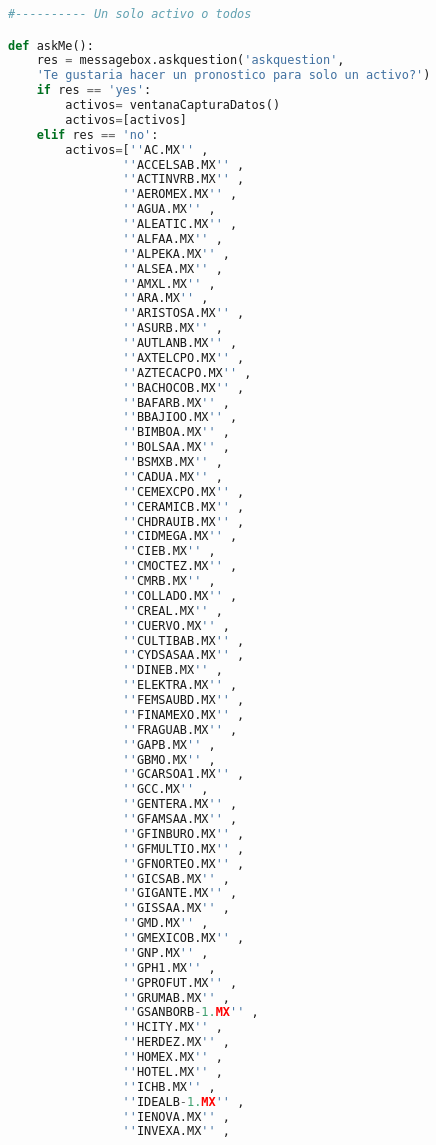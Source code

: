 \documentclass[letterpaper,12pt,oneside]{book}
\begin{document}
\begin{lstlisting}[language=Python]
#---------- Un solo activo o todos

def askMe():
    res = messagebox.askquestion('askquestion', 
    'Te gustaria hacer un pronostico para solo un activo?')
    if res == 'yes':
        activos= ventanaCapturaDatos()
        activos=[activos]
    elif res == 'no':
        activos=[''AC.MX'' , 
                ''ACCELSAB.MX'' ,
                ''ACTINVRB.MX'' , 
                ''AEROMEX.MX'' , 
                ''AGUA.MX'' , 
                ''ALEATIC.MX'' , 
                ''ALFAA.MX'' , 
                ''ALPEKA.MX'' , 
                ''ALSEA.MX'' , 
                ''AMXL.MX'' ,
                ''ARA.MX'' , 
                ''ARISTOSA.MX'' , 
                ''ASURB.MX'' , 
                ''AUTLANB.MX'' , 
                ''AXTELCPO.MX'' , 
                ''AZTECACPO.MX'' ,
                ''BACHOCOB.MX'' , 
                ''BAFARB.MX'' , 
                ''BBAJIOO.MX'' , 
                ''BIMBOA.MX'' , 
                ''BOLSAA.MX'' , 
                ''BSMXB.MX'' , 
                ''CADUA.MX'' , 
                ''CEMEXCPO.MX'' , 
                ''CERAMICB.MX'' , 
                ''CHDRAUIB.MX'' , 
                ''CIDMEGA.MX'' , 
                ''CIEB.MX'' , 
                ''CMOCTEZ.MX'' , 
                ''CMRB.MX'' , 
                ''COLLADO.MX'' , 
                ''CREAL.MX'' , 
                ''CUERVO.MX'' , 
                ''CULTIBAB.MX'' , 
                ''CYDSASAA.MX'' , 
                ''DINEB.MX'' , 
                ''ELEKTRA.MX'' , 
                ''FEMSAUBD.MX'' , 
                ''FINAMEXO.MX'' , 
                ''FRAGUAB.MX'' , 
                ''GAPB.MX'' ,  
                ''GBMO.MX'' , 
                ''GCARSOA1.MX'' , 
                ''GCC.MX'' , 
                ''GENTERA.MX'' , 
                ''GFAMSAA.MX'' , 
                ''GFINBURO.MX'' , 
                ''GFMULTIO.MX'' , 
                ''GFNORTEO.MX'' , 
                ''GICSAB.MX'' , 
                ''GIGANTE.MX'' , 
                ''GISSAA.MX'' , 
                ''GMD.MX'' , 
                ''GMEXICOB.MX'' ,  
                ''GNP.MX'' , 
                ''GPH1.MX'' , 
                ''GPROFUT.MX'' , 
                ''GRUMAB.MX'' , 
                ''GSANBORB-1.MX'' , 
                ''HCITY.MX'' , 
                ''HERDEZ.MX'' , 
                ''HOMEX.MX'' , 
                ''HOTEL.MX'' , 
                ''ICHB.MX'' , 
                ''IDEALB-1.MX'' , 
                ''IENOVA.MX'' , 
                ''INVEXA.MX'' ,

\end{lstlisting}
\end{document}
